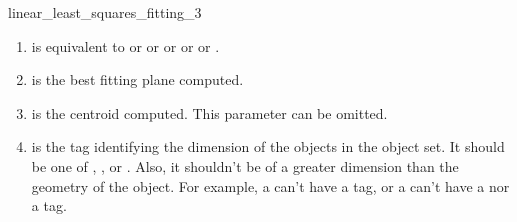 \begin{ccRefFunction}{linear_least_squares_fitting_3}
\begin{enumerate}
   \item  {} is equivalent to  or
           or  or  or
           or .
   \item  {} is the best fitting plane computed.
   \item  {} is the centroid computed. This parameter can be
          omitted.
   \item  {} is the tag identifying the dimension of the objects in the object set. It should be one of , ,  or . Also, it shouldn't be of a greater dimension than the geometry of the object. For example, a  can't have a  tag, or a  can't have a  nor a  tag.
\end{enumerate}

\end{ccRefFunction}
